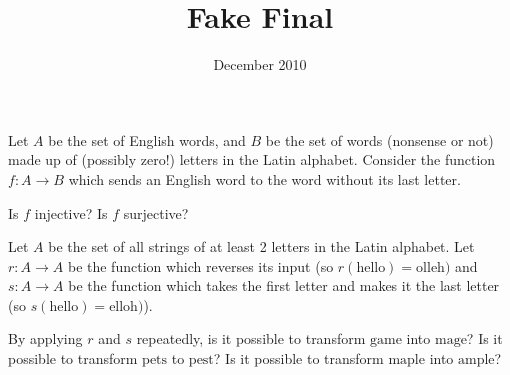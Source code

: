 \documentclass[12pt]{midterm}
\title{Fake Final}
\date{December 2010}
\begin{document}
\begin{exam}


\begin{problem}[350]
  Let $A$ be the set of English words, and $B$ be the set of words
  (nonsense or not) made up of (possibly zero!) letters in the Latin
  alphabet.  Consider the function $f : A \to B$ which sends an
  English word to the word without its last letter.

  Is $f$ injective?  Is $f$ surjective?
\end{problem}

\begin{solution}\begin{solutiontext}
\end{solutiontext}\end{solution}

\begin{problem}[350]
  Let $A$ be the set of all strings of at least 2 letters in the Latin
  alphabet.  Let $r : A \to A$ be the function which reverses its
  input (so $r(\mbox{hello}) = \mbox{olleh})$ and $s : A \to A$ be the
  function which takes the first letter and makes it the last letter (so $s(\mbox{hello})
  = \mbox{elloh})$).

  By applying $r$ and $s$ repeatedly, is it possible to transform
  $\mbox{game}$ into $\mbox{mage}$?  Is it possible to transform
  $\mbox{pets}$ to $\mbox{pest}$?  Is it possible to transform
  $\mbox{maple}$ into $\mbox{ample}$?
\end{problem}


\end{exam}
\end{document}
